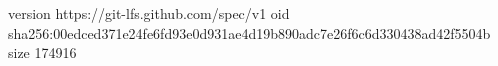 version https://git-lfs.github.com/spec/v1
oid sha256:00edced371e24fe6fd93e0d931ae4d19b890adc7e26f6c6d330438ad42f5504b
size 174916
